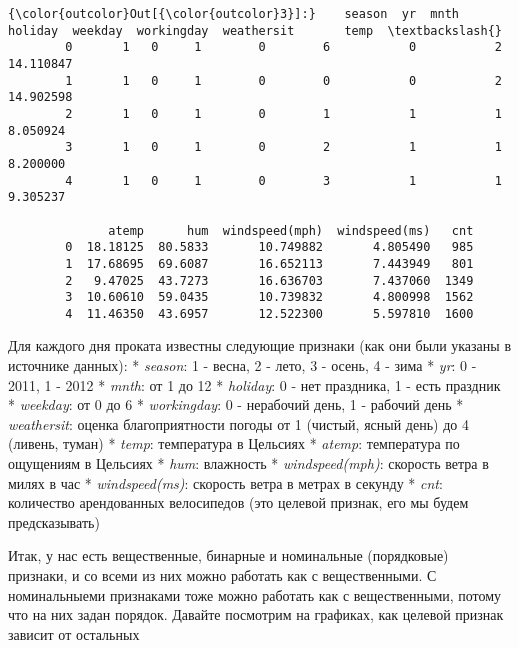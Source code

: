 \documentclass[11pt]{article}
\begin{document}
\begin{Verbatim}[commandchars=\\\{\}]
{\color{outcolor}Out[{\color{outcolor}3}]:}    season  yr  mnth  holiday  weekday  workingday  weathersit       temp  \textbackslash{}
        0       1   0     1        0        6           0           2  14.110847   
        1       1   0     1        0        0           0           2  14.902598   
        2       1   0     1        0        1           1           1   8.050924   
        3       1   0     1        0        2           1           1   8.200000   
        4       1   0     1        0        3           1           1   9.305237   
        
              atemp      hum  windspeed(mph)  windspeed(ms)   cnt  
        0  18.18125  80.5833       10.749882       4.805490   985  
        1  17.68695  69.6087       16.652113       7.443949   801  
        2   9.47025  43.7273       16.636703       7.437060  1349  
        3  10.60610  59.0435       10.739832       4.800998  1562  
        4  11.46350  43.6957       12.522300       5.597810  1600  
\end{Verbatim}
            
    Для каждого дня проката известны следующие признаки (как они были
указаны в источнике данных): * \emph{season}: 1 - весна, 2 - лето, 3 -
осень, 4 - зима * \emph{yr}: 0 - 2011, 1 - 2012 * \emph{mnth}: от 1 до
12 * \emph{holiday}: 0 - нет праздника, 1 - есть праздник *
\emph{weekday}: от 0 до 6 * \emph{workingday}: 0 - нерабочий день, 1 -
рабочий день * \emph{weathersit}: оценка благоприятности погоды от 1
(чистый, ясный день) до 4 (ливень, туман) * \emph{temp}: температура в
Цельсиях * \emph{atemp}: температура по ощущениям в Цельсиях *
\emph{hum}: влажность * \emph{windspeed(mph)}: скорость ветра в милях в
час * \emph{windspeed(ms)}: скорость ветра в метрах в секунду *
\emph{cnt}: количество арендованных велосипедов (это целевой признак,
его мы будем предсказывать)

Итак, у нас есть вещественные, бинарные и номинальные (порядковые)
признаки, и со всеми из них можно работать как с вещественными. С
номинальныеми признаками тоже можно работать как с вещественными, потому
что на них задан порядок. Давайте посмотрим на графиках, как целевой
признак зависит от остальных
\end{document}
